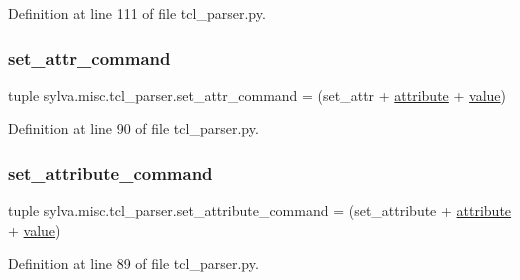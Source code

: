 Definition at line 111 of file tcl\+\_\+parser.\+py.

\mbox{\label{namespacesylva_1_1misc_1_1tcl__parser_a310173d7899d08bcad2ec9f671348bf3}} 
\subsubsection{\texorpdfstring{set\+\_\+attr\+\_\+command}{set\_attr\_command}}
{\footnotesize\ttfamily tuple sylva.\+misc.\+tcl\+\_\+parser.\+set\+\_\+attr\+\_\+command = (set\+\_\+attr + \hyperlink{namespacesylva_1_1misc_1_1tcl__parser_ade6aa1a9697fd50d76f10d8ef7474363}{attribute} + \hyperlink{namespacesylva_1_1misc_1_1tcl__parser_a83a1a4d978bc1a8a1bd92f71b754bad9}{value})}



Definition at line 90 of file tcl\+\_\+parser.\+py.

\mbox{\label{namespacesylva_1_1misc_1_1tcl__parser_a41d78ece735b8cfe1b91e423ca73f72f}} 
\subsubsection{\texorpdfstring{set\+\_\+attribute\+\_\+command}{set\_attribute\_command}}
{\footnotesize\ttfamily tuple sylva.\+misc.\+tcl\+\_\+parser.\+set\+\_\+attribute\+\_\+command = (set\+\_\+attribute + \hyperlink{namespacesylva_1_1misc_1_1tcl__parser_ade6aa1a9697fd50d76f10d8ef7474363}{attribute} + \hyperlink{namespacesylva_1_1misc_1_1tcl__parser_a83a1a4d978bc1a8a1bd92f71b754bad9}{value})}



Definition at line 89 of file tcl\+\_\+parser.\+py.

\mbox{\label{namespacesylva_1_1misc_1_1tcl__parser_a92069bbdbd952a10c724671781cfcfd6}} 
